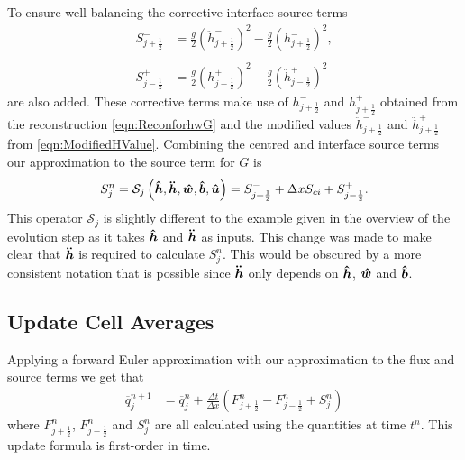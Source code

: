 To ensure well-balancing the corrective interface source terms
	\begin{align*}
	 S^{-}_{j + \frac{1}{2}} &=  \frac{g}{2} \left(\ddot{h}^{-}_{j + \frac{1}{2}} \right)^2 - \frac{g}{2} \left(h^{-}_{j + \frac{1}{2}} \right)^2, \\ \\
	  S^{+}_{j - \frac{1}{2}} &=  \frac{g}{2} \left(h^{+}_{j - \frac{1}{2}}\right)^2 - \frac{g}{2}\left(\ddot{h}^{+}_{j - \frac{1}{2}}\right)^2 
	\end{align*}
are also added. These corrective terms make use of $h^{-}_{j + \frac{1}{2}}$ and $h^{+}_{j + \frac{1}{2}}$ obtained from the reconstruction \eqref{eqn:ReconforhwG} and the modified values $\ddot{h}^{-}_{j + \frac{1}{2}}$ and $\ddot{h}^{+}_{j + \frac{1}{2}}$ from \eqref{eqn:ModifiedHValue}. Combining the centred and interface source terms our approximation to the source term for $G$ is 
\begin{equation*}
S^n_j = \mathcal{S}_j\left( \boldsymbol{\hat{h}},\boldsymbol{\ddot{h}},\boldsymbol{\hat{w}},\boldsymbol{\hat{b}}, \boldsymbol{\hat{u}}  \right)=   S^{-}_{j + \frac{1}{2}} + \Delta x S_{ci} + S^{+}_{j - \frac{1}{2}}.
\end{equation*}
This operator $\mathcal{S}_j$ is slightly different to the example given in the overview of the evolution step as it takes $\boldsymbol{\hat{h}}$ and $\boldsymbol{\ddot{h}}$ as inputs. This change was made to make clear that $\boldsymbol{\ddot{h}}$ is required to calculate $S^n_j$. This would be obscured by a more consistent notation that is possible since $\boldsymbol{\ddot{h}}$ only depends on $\boldsymbol{\hat{h}}$, $\boldsymbol{\hat{w}}$ and $\boldsymbol{\hat{b}}$. 


\subsection{Update Cell Averages}
Applying a forward Euler approximation with our approximation to the flux and source terms we get that
\begin{align}
\overline{q}^{n+1}_j &= \overline{q}^{n}_j + \frac{\Delta t}{\Delta x} \left(F^n_{j+\frac{1}{2}} - F^n_{j-\frac{1}{2}} + S^n_j\right)
\label{eqn:UpdateMethod}
\end{align}
where $F^n_{j+\frac{1}{2}}$, $F^n_{j-\frac{1}{2}}$ and $S^n_j$ are all calculated using the quantities at time $t^n$. This update formula is first-order in time.


